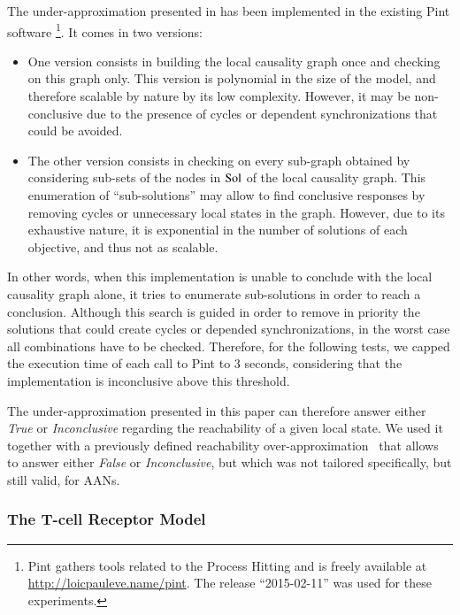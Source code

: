 The under-approximation presented in  has been implemented
in the existing Pint software%
\footnote{Pint gathers tools related to the Process Hitting
and is freely available at \url{http://loicpauleve.name/pint}.
The release “2015-02-11” was used for these experiments.}.
It comes in two versions:
\begin{itemize}
  \item One version consists in building the local causality graph once
    and checking  on this graph only.
    This version is polynomial in the size of the model,
    and therefore scalable by nature by its low complexity.
    However, it may be non-conclusive due to the presence of cycles
    or dependent synchronizations that could be avoided.
  \item The other version consists in checking 
    on every sub-graph obtained by considering sub-sets of the nodes in $\mathrm{Sol}$
    of the local causality graph.
    This enumeration of “sub-solutions” may allow to find conclusive
    responses by removing cycles or unnecessary local states in the graph.
    However, due to its exhaustive nature,
    it is exponential in the number of solutions of each objective,
    and thus not as scalable.
\end{itemize}
In other words, when this implementation is unable to conclude with the
local causality graph alone, it tries to enumerate sub-solutions
in order to reach a conclusion.
Although this search is guided in order to remove in priority
the solutions that could create cycles or depended synchronizations,
in the worst case all combinations have to be checked.
Therefore, for the following tests, we capped the execution time
of each call to Pint to 3 seconds,
considering that the implementation is inconclusive above this threshold.

The under-approximation presented in this paper can therefore answer
either \emph{True} or \emph{Inconclusive} regarding the reachability
of a given local state.
We used it together with a previously defined
reachability over-approximation~\cite{PMR12-MSCS}
that allows to answer either \emph{False} or \emph{Inconclusive},
but which was not tailored specifically, but still valid, for AANs.

\subsubsection*{The T-cell Receptor Model}

